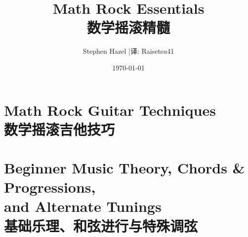 \documentclass[10pt,a4paper]{book}
\title{\LARGE\sffamily\bfseries\color{california}%
  Math Rock Essentials \\[4pt]
  \large\sffamily\color{caalt}%
  数学摇滚精髓}
\author{Stephen Hazel \quad|\quad 译: Raisetsu41}
\date{\today}
\begin{document}

\frontmatter
\maketitle
\tableofcontents
\clearpage



\mainmatter

\part[Math Rock Guitar Techniques]{\texorpdfstring{Math Rock Guitar Techniques \\[4pt] \normalsize 数学摇滚吉他技巧}{Math Rock Guitar Techniques --- 数学摇滚吉他技巧}}


\part[Beginner Music Theory, Chords \& Progressions, and Alternate Tunings]{\texorpdfstring{Beginner Music Theory, Chords \& Progressions, \\[4pt] \normalsize and Alternate Tunings \\[4pt] 基础乐理、和弦进行与特殊调弦}{Beginner Music Theory, Chords \& Progressions, and Alternate Tunings --- 基础乐理、和弦进行与特殊调弦}}

\end{document}
